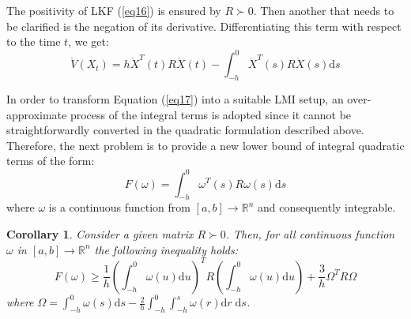 \documentclass[a4paper]{cas-sc}
\newtheorem{corollary}[theorem]{Corollary}
\begin{document}
The positivity of LKF (\ref{eq16}) is ensured by $ R \succ 0 $. Then another that needs to be clarified is the negation of its derivative. Differentiating this term with respect to the time $t$, we get:
\begin{equation}
  \dot V\left( {{X_t}} \right) = h{\dot X^T}(t)R\dot X(t) - \int_{ - h}^0 {{{\dot X}^T}} (s)R\dot X(s){\text{d}}s
  \label{eq17}
\end{equation}

In order to transform Equation (\ref{eq17}) into a suitable LMI setup, an over-approximate process of the integral terms is adopted since it cannot be straightforwardly converted in the quadratic formulation described above. Therefore, the next problem is to provide a new lower bound of integral quadratic terms of the form:
\begin{equation}
  F(\omega ) = \int_{ - h}^0 {{\omega ^T}} (s)R\omega (s){\text{d}}s
  \label{eq18}
\end{equation}
where $ \omega  $ is a continuous function from $ [a,b] \to {\mathbb{R}^n} $ and consequently integrable.

\begin{corollary}
  \label{coro4}
  Consider a given matrix $ R \succ 0 $. Then, for all continuous function $ \omega  $ in $ [a,b] \to {\mathbb{R}^n} $ the following inequality holds:
  \begin{equation}
    F(\omega ) \geqslant \frac{1}{h}{\left( {\int_{ - h}^0 {\omega (u){\text{d}}u} } \right)^T}R\left( {\int_{ - h}^0 {\omega (u){\text{d}}u} } \right) + \frac{3}{h}{\Omega ^T}R\Omega
    \label{eq19}
  \end{equation}
  where $ \Omega  = \int_{ - h}^0 {\omega (s){\text{d}}s}  - \frac{2}{h}\int_{ - h}^0 {\int_{ - h}^s {\omega (r){\text{d}}r\;{\text{d}}s} }  $.
\end{corollary}
\end{document}
